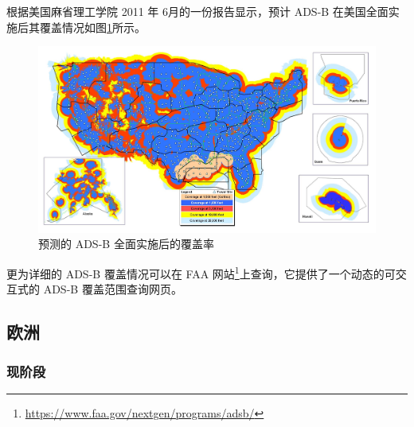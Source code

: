 
根据美国麻省理工学院 2011 年 6月的一份报告显示，预计 ADS-B 在美国全面实施后其覆盖情况如图\ref{fig:ADSB-final}所示。

\begin{figure}[!htb]
\centering
\includegraphics[width=14cm]{pic/ADSB-final.png}
\caption{预测的 ADS-B 全面实施后的覆盖率\protect\footnotemark}
\label{fig:ADSB-final}
\end{figure}


更为详细的 ADS-B 覆盖情况可以在 FAA 网站\footnote{\url{https://www.faa.gov/nextgen/programs/adsb/}}上查询，它提供了一个动态的可交互式的 ADS-B 覆盖范围查询网页。

\subsection{欧洲}

\subsubsection{现阶段}

